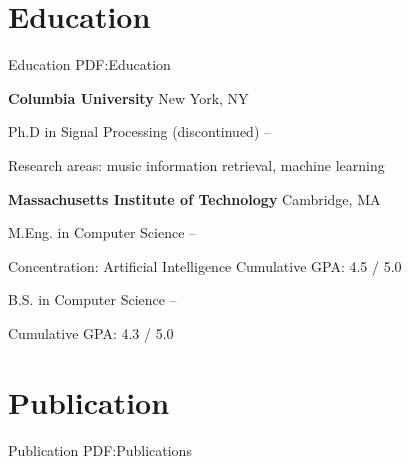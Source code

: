 \documentclass[a4paper,10pt,oneside]{article}
\begin{document}
\begin{body}

\section
{Education}
{Education}
{PDF:Education}

\textbf{Columbia University}
\hfill New York, NY
\par
Ph.D in Signal Processing (discontinued)
\hfill
{} -- 
\begin{detail}
\BulletItem
Research areas:
music information retrieval, machine learning
\end{detail}

\SmallEntryGap

\textbf{Massachusetts Institute of Technology}
\hfill Cambridge, MA
\par
M.Eng. in
Computer Science
\hfill
{} --
\begin{detail}
\BulletItem
Concentration: Artificial Intelligence
\BulletItem
Cumulative GPA: 4.5 / 5.0
\end{detail}

B.S. in Computer Science
\hfill
{} --
\begin{detail}
\BulletItem
Cumulative GPA: 4.3 / 5.0
\end{detail}

%
%
%
%



\section
{Publication}
{Publication}
{PDF:Publications}


\end{body}
\end{document}
